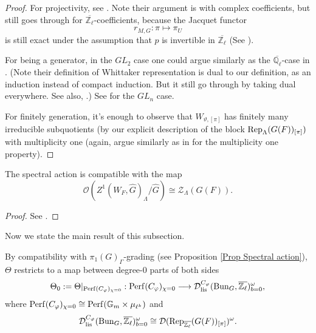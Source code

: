 \begin{proof}
	For projectivity, see \cite[Section 4]{aizenbud2022strong}. Note their argument is with complex coefficients, but still goes through for $\overline{\mathbb{Z}_{\ell}}$-coefficients, because the Jacquet functor 
	$$r_{M, G}: \pi \mapsto \pi_U$$
	is still exact under the assumption that $p$ is invertible in $\overline{\mathbb{Z}_{\ell}}$ (See \cite[Section II.2.1]{vigneras1996representations}).
	
	For being a generator, in the $GL_2$ case one could argue similarly as the $\overline{\mathbb{Q}_{\ell}}$-case in \cite[Section 39]{bushnell2006local}. (Note their definition of Whittaker representation is dual to our definition, as an induction instead of compact induction. But it still go through by taking dual everywhere. See also, \cite[Section 2.1 and others]{bushnell2003generalized}.) See \cite{bushnell2003generalized} for the $GL_n$ case.
	
	For finitely generation, it's enough to observe that $W_{\vartheta, [\pi]}$ has finitely many irreducible subquotients (by our explicit description of the block $\operatorname{\operatorname{Rep}}_{\Lambda}(G(F))_{[\pi]})$ with multiplicity one (again, argue similarly as in \cite[Section 39]{bushnell2006local} for the multiplicity one property).
\end{proof}

\begin{lemma}\label{Lemma Spectral action Bern center}
	The spectral action is compatible with the map 
	$$\mathcal{O}(Z^1(W_F, \hat{G})_{\Lambda}/\hat{G}) \cong \mathcal{Z}_{\Lambda}(G(F)).$$
\end{lemma}

\begin{proof}
	See \cite[Section 5]{zou2022categorical}.
\end{proof}

Now we state the main result of this subsection.

By compatibility with $\pi_1(G)_{\Gamma}$-grading (see Proposition \ref{Prop Spectral action}), $\Theta$ restricts to a map between degree-$0$ parts of both sides
$$\Theta_0:=\Theta|_{\operatorname{\operatorname{Perf}}(C_{\varphi})_{\chi=0}}: \operatorname{\operatorname{Perf}}(C_{\varphi})_{\chi=0} \longrightarrow \mathcal{D}_{\operatorname{\operatorname{lis}}}^{C_{\varphi}}(\operatorname{\operatorname{Bun}}_G, \overline{\mathbb{Z}_{\ell}})^{\omega}_{b=0},$$
where $\operatorname{\operatorname{Perf}}(C_{\varphi})_{\chi=0} \cong \operatorname{\operatorname{Perf}}(\mathbb{G}_m \times \mu_{\ell^k})$ and 
$$\mathcal{D}_{\operatorname{\operatorname{lis}}}^{C_{\varphi}}(\operatorname{\operatorname{Bun}}_G, \overline{\mathbb{Z}_{\ell}})^{\omega}_{b=0} \cong \mathcal{D}(\operatorname{\operatorname{Rep}}_{\overline{\mathbb{Z}_{\ell}}}(G(F))_{[\pi]})^{\omega}.$$


